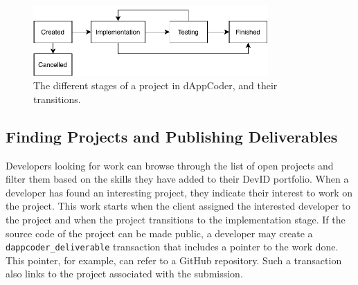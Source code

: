 \begin{figure}[t!]
	\centering
	\includegraphics[width=0.8\textwidth]{devid/resources/devid_project.pdf}
	\caption{The different stages of a project in dAppCoder, and their transitions.}
	\label{fig:devid_project}
\end{figure}

\subsection{Finding Projects and Publishing Deliverables}
\label{subsec:create_submissions}
Developers looking for work can browse through the list of open projects and filter them based on the skills they have added to their DevID portfolio.
When a developer has found an interesting project, they indicate their interest to work on the project.
This work starts when the client assigned the interested developer to the project and when the project transitions to the implementation stage.
If the source code of the project can be made public, a developer may create a \texttt{dappcoder\_deliverable} transaction that includes a pointer to the work done.
This pointer, for example, can refer to a GitHub repository.
Such a transaction also links to the project associated with the submission.


